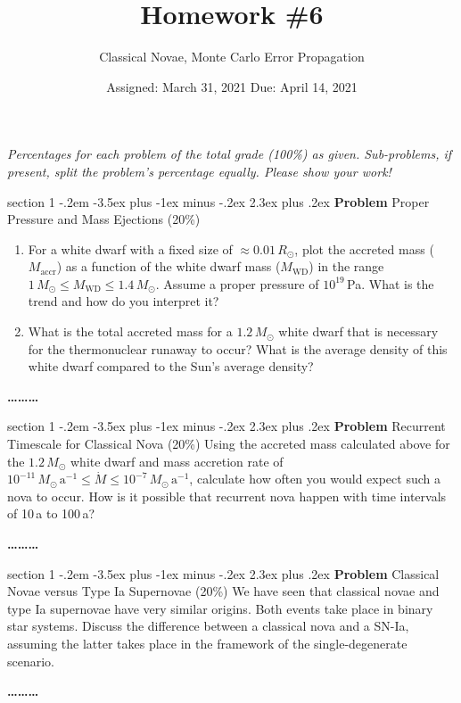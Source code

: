 \documentclass[letterpaper,12pt,twoside=false,DIV=11]{scrartcl}
\makeatletter
\newcommand{\topic}{\author}
\newenvironment{problem}{\@startsection
    {section}
    {1}
    {-.2em}
    {-3.5ex plus -1ex minus -.2ex}
    {2.3ex plus .2ex}
    {
        \pagebreak[3] %
        \noindent\sffamily\bfseries Problem
    }
}
{
    \begin{center}\large\bfseries\ldots\ldots\ldots\end{center}
}
\makeatother
\begin{document}
\title{Homework \#6}
\topic{Classical Novae, Monte Carlo Error Propagation}
\date{Assigned: March 31, 2021 \qquad Due: April 14, 2021}

\maketitle
\thispagestyle{fancy}

\noindent\emph{Percentages for each problem of the total grade (100\%) as given. Sub-problems, if present, split the problem's percentage equally. Please show your work!}

\begin{problem}{Proper Pressure and Mass Ejections (20\%)}
\begin{enumerate}
    \item For a white dwarf with a fixed size of $\approx 0.01\,R_\odot$, plot the accreted mass ($M_\mathrm{accr}$) as a function of the white dwarf mass ($M_\mathrm{WD}$) in the range $1\,M_\odot \leq M_\mathrm{WD} \leq 1.4\,M_\odot$. Assume a proper pressure of $10^{19}$\,Pa. What is the trend and how do you interpret it?
    \item What is the total accreted mass for a $1.2\,M_\odot$ white dwarf that is necessary for the thermonuclear runaway to occur? What is the average density of this white dwarf compared to the Sun's average density?
\end{enumerate}
\end{problem}

\begin{problem}{Recurrent Timescale for Classical Nova (20\%)}
Using the accreted mass calculated above for the $1.2\,M_\odot$ white dwarf and mass accretion rate of $10^{-11}\,M_\odot\,\mathrm{a}^{-1} \leq \dot{M} \leq 10^{-7}\,M_\odot\,\mathrm{a}^{-1}$, calculate how often you would expect such a nova to occur. How is it possible that recurrent nova happen with time intervals of 10\,a to 100\,a?
\end{problem}

\begin{problem}{Classical Novae versus Type Ia Supernovae (20\%)}
We have seen that classical novae and type Ia supernovae have very similar origins. Both events take place in binary star systems. Discuss the difference between a classical nova and a SN-Ia, assuming the latter takes place in the framework of the single-degenerate scenario.
\end{problem}
\end{document}
